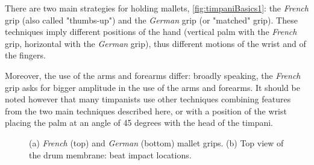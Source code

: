There are two main strategies for holding mallets, \myfigname \ref{fig:timpaniBasics1}: the \emph{French} grip (also called "thumbs-up") and the \emph{German} grip (or "matched" grip). These techniques imply different positions of the hand (vertical palm with the \emph{French} grip, horizontal with the \emph{German} grip), thus different motions of the wrist and of the fingers. 

Moreover, the use of the arms and forearms differ: broadly speaking, the \emph{French} grip asks for bigger amplitude in the use of the arms and forearms. It should be noted however that many timpanists use other techniques combining features from the two main techniques described here, or with a position of the wrist placing the palm at an angle of 45 degrees with the head of the timpani.\\

\begin{figure}%
	\begin{center}
	\end{center}
	\vspace{-0.5cm}
	\caption[Mallet grips and beat impact locations]{(a) \emph{French} (top) and \emph{German} (bottom) mallet grips. (b) Top view of the drum membrane: beat impact locations.}
	\label{fig:timpaniBasics}
\end{figure}

